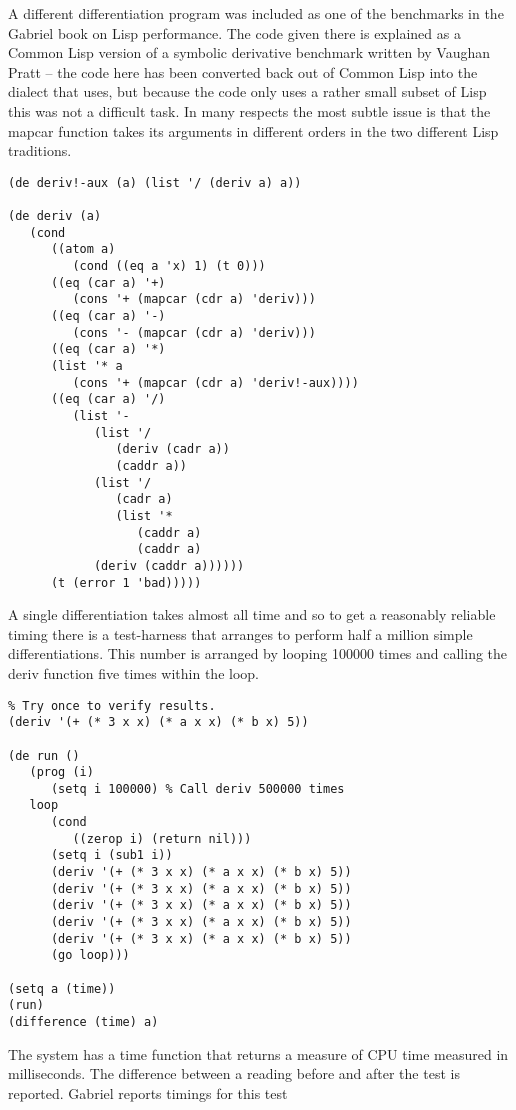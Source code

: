 A different differentiation program was included as one of the
benchmarks in the Gabriel\cite{Gabriel} book on Lisp performance. The code
given there is explained as a Common Lisp version of a symbolic
derivative benchmark written by Vaughan Pratt -- the code here has
been converted back out of Common Lisp into the dialect that \vsl{} uses,
but because the code only uses a rather small subset of Lisp this
was not a difficult task. In many respects the most subtle issue is that
the mapcar function takes its arguments in different orders in the two
different Lisp traditions.
{\small\begin{verbatim}
(de deriv!-aux (a) (list '/ (deriv a) a))

(de deriv (a)
   (cond
      ((atom a)
         (cond ((eq a 'x) 1) (t 0)))
      ((eq (car a) '+)
         (cons '+ (mapcar (cdr a) 'deriv)))
      ((eq (car a) '-)
         (cons '- (mapcar (cdr a) 'deriv)))
      ((eq (car a) '*)
      (list '* a
         (cons '+ (mapcar (cdr a) 'deriv!-aux))))
      ((eq (car a) '/)
         (list '-
            (list '/
               (deriv (cadr a))
               (caddr a))
            (list '/
               (cadr a)
               (list '*
                  (caddr a)
                  (caddr a)
            (deriv (caddr a))))))
      (t (error 1 'bad)))))
\end{verbatim}}
A single differentiation takes almost all time and so to
get a reasonably reliable timing there is a test-harness that
arranges to perform half a million simple differentiations. This
number is arranged by looping 100000 times and calling the {\tx deriv}
function five times within the loop.
{\small\begin{verbatim}
% Try once to verify results.
(deriv '(+ (* 3 x x) (* a x x) (* b x) 5))

(de run ()
   (prog (i)
      (setq i 100000) % Call deriv 500000 times
   loop
      (cond
         ((zerop i) (return nil)))
      (setq i (sub1 i))
      (deriv '(+ (* 3 x x) (* a x x) (* b x) 5))
      (deriv '(+ (* 3 x x) (* a x x) (* b x) 5))
      (deriv '(+ (* 3 x x) (* a x x) (* b x) 5))
      (deriv '(+ (* 3 x x) (* a x x) (* b x) 5))
      (deriv '(+ (* 3 x x) (* a x x) (* b x) 5))
      (go loop)))

(setq a (time))
(run)
(difference (time) a)
\end{verbatim}}
The \vsl{} system has a {\tx time} function that returns a measure of
CPU time measured in milliseconds. The difference between a reading before
and after the test is reported. Gabriel reports timings for this test
